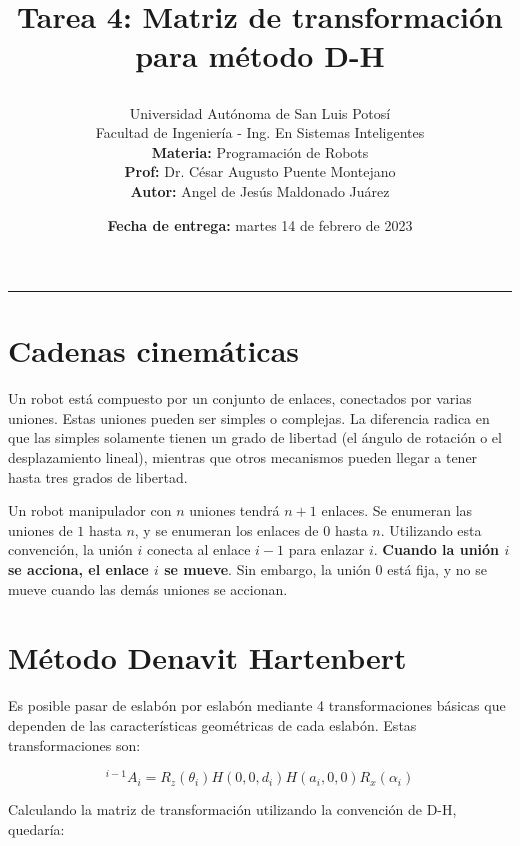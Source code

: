 \documentclass[a4paper, 12pt]{article}
\title{
    \vspace{-3cm}Tarea 4: Matriz de transformación para método D-H
    \author{
        Universidad Autónoma de San Luis Potosí\\
        Facultad de Ingeniería - Ing. En Sistemas Inteligentes\\
        \textbf{Materia:} Programación de Robots\\
        \textbf{Prof:} Dr. César Augusto Puente Montejano\\
        \textbf{Autor:} Angel de Jesús Maldonado Juárez
    }
    \date{\textbf{Fecha de entrega:} martes 14 de febrero de 2023}
}
\begin{document}
\maketitle
\hrule\vspace*{1cm}
\section*{Cadenas cinemáticas}
Un robot está compuesto por un conjunto de enlaces, conectados
por varias uniones. Estas uniones pueden ser simples o complejas.
La diferencia radica en que las simples solamente tienen un
grado de libertad (el ángulo de rotación o el desplazamiento lineal),
mientras que otros mecanismos pueden llegar a tener hasta tres
grados de libertad.

Un robot manipulador con \(n\) uniones tendrá \(n+1\) enlaces.
Se enumeran las uniones de \(1\) hasta \(n\), y se enumeran los
enlaces de \(0\) hasta \(n\). Utilizando esta convención, la unión
\(i\) conecta al enlace \(i-1\) para enlazar \(i\). \textbf{Cuando
    la unión \(i\) se acciona, el enlace \(i\) se mueve}. Sin embargo,
la unión \(0\) está fija, y no se mueve cuando las demás uniones se
accionan.

\section*{Método Denavit Hartenbert}
Es posible pasar de eslabón por eslabón mediante 4 transformaciones
básicas que dependen de las características geométricas de cada
eslabón. Estas transformaciones son:

\begin{equation}
    ^{i-1}A_i=R_z(\theta_i)H(0,0,d_i)H(a_i,0,0)R_x(\alpha_i)
\end{equation}

Calculando la matriz de transformación utilizando la convención de
D-H, quedaría:
\end{document}
